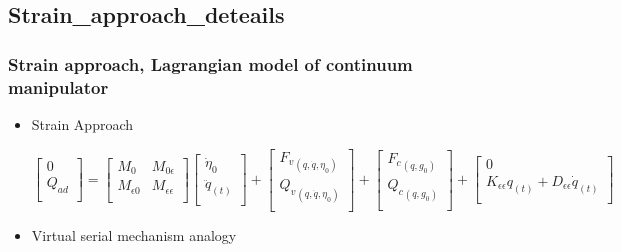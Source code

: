 \documentclass[compress]{thesisbeamer}
\begin{document}
		\subsection{Strain_approach_deteails}
        \begin{frame}
        	\frametitle{Strain approach, Lagrangian model of continuum manipulator}
			\begin{itemize}%
  				\item Strain Approach
  				\begin{fleqn}
  				\begin{equation}
  					\begin{bmatrix}
  							0 		\\
  						{Q}_{ad}	\\
					\end{bmatrix} 
					= 
					\begin{bmatrix}
						{M}_{0}		& {M}_{0\epsilon} 				\\ 
						{M}_{\epsilon0}	& {M}_{\epsilon\epsilon}	\\
					\end{bmatrix}
					\begin{bmatrix}
						{\dot{\eta}}_{0} 	\\ 
						{\ddot{q}}_{(t)}	\\
					\end{bmatrix}	
					+
					\begin{bmatrix}
						{{F}_{v}}_{\left(q , \dot{q} , {\eta}_{0} \right)}	\\
						{{Q}_{v}}_{\left(q , \dot{q} , {\eta}_{0} \right)}	\\
					\end{bmatrix}
					+
					\begin{bmatrix}
						{{F}_{c}}_{\left(q , {g}_{0} \right)}	\\ 
						{{Q}_{c}}_{\left(q , {g}_{0} \right)}	\\
					\end{bmatrix}
					+
					\begin{bmatrix}
						0 \\
						{K}_{\epsilon\epsilon} {q}_{\left(t \right)} + {D}_{\epsilon\epsilon} {\dot{q}}_{\left(t \right)}	\\
					\end{bmatrix}
  				\end{equation} 
  				\end{fleqn}
  				\item Virtual serial mechanism analogy			
  				\begin{itemize}

\end{itemize}
\end{itemize}
\end{frame}
\end{document}
